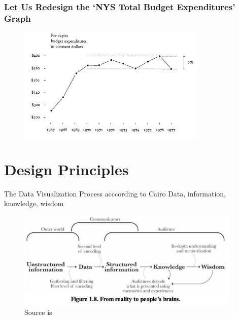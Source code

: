 \documentclass[aspectratio=1610]{beamer}
\begin{document}
\begin{frame}
	\frametitle{Let Us Redesign the `NYS Total Budget Expenditures' Graph}
	\begin{figure}
		\begin{small}
			\begin{center}
				\includegraphics[width=0.8\textwidth]{
					images/redo_nys_budget.png
				}
			\end{center}
		\end{small}
	\end{figure}
\end{frame}

\section{Design Principles}

\begin{frame}{The Data Visualization Process acccording to Cairo}
	{Data, information, knowledge, wisdom}{}
	\begin{figure}
		\includegraphics[width=0.95\textwidth]{images/cairo_model.png}
		\caption*{Source is \cite[][page 29]{cairo2012}}
	\end{figure}
\end{frame}
\end{document}
